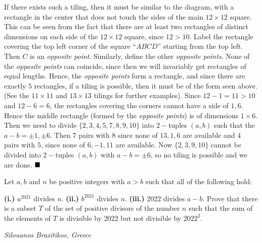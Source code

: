 \documentclass[fontsize=9pt]{scrartcl}
\begin{document}
	If there exists such a tiling, then it must be similar to the diagram, with a rectangle
	in the center that does not touch the sides of the main $12 \times 12$ square.
	This can be seen from the fact that there are at least two rectangles of
	distinct dimensions on each side of the $12 \times 12$ square, since $12 > 10$.
	Label the rectangle covering the top left corner of the square ``$ABCD$''
	starting from the top left. Then $C$ is an \emph{opposite point}. Similarly,
	define the other \emph{opposite points}. None of the \emph{opposite points} can
	coincide, since then we will invariably get rectangles of equal lengths. Hence,
	the \emph{opposite points} form a rectangle, and since there are exactly $5$
	rectangles, if a tiling is possible, then it must be of the form seen above. (See
	the $11 \times 11$ and $13 \times 13$ tilings for further examples).
	\newline
	Since $12-1=11>10$ and $12-6=6$, the rectangles covering the corners cannot have
	a side of $1,6$. Hence the middle rectangle (formed by the \emph{opposite
	points}) is of dimensions $1\times 6$. Then we need to divide
	$\{2,3,4,5,7,8,9,10 \}$ into $2-$tuples $(a,b)$ such that the $a-b = \pm 1,\pm6$.
	Then $7$ pairs with $8$ since none of $13, 1, 6$ are available and $4$ pairs
	with $5$, since none of $6, -1, 11$ are available. Now $\{2,3,9,10\}$ cannot
	be divided into $2-$tuples $(a,b)$ with $a-b = \pm 6$, so no tiling is
	possible and we are done. $\hfill \blacksquare$ ~\\
	\begin{tcolorbox}
		[colback=white!5!white,colframe=purple!75!white,title=\textsf{Problem 4: (Balkan
		MO 2022)}, opacityback=1] Let $a, b$ and $n$ be positive integers with $a>b$
		such that all of the following hold:
		\newline

		\textbf{(i.)} $a^{2021}$ divides $n$.
		\newline
		\textbf{(ii.)} $b^{2021}$ divides $n$.
		\newline
		\textbf{(iii.)} 2022 divides $a-b$.
		\newline
		\newline
		Prove that there is a subset $T$ of the set of positive divisors of the number
		$n$ such that the sum of the elements of $T$ is divisible by 2022 but not divisible
		by $2022^{2}$.
	\end{tcolorbox}
	\hfill \emph{Silouanos Brazitikos, Greece}
\end{document}
